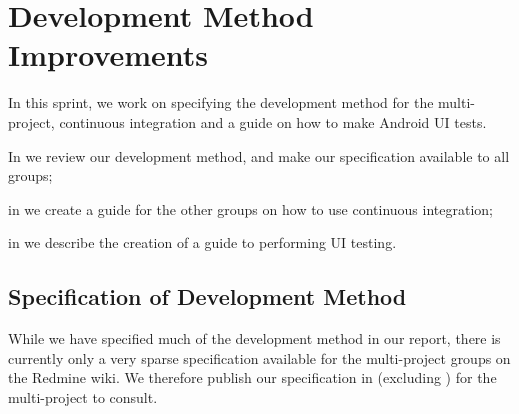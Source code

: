 \chapter{Development Method Improvements}\label{sec:process_improvements}
In this sprint, we work on specifying the development method for the multi-project, continuous integration and a guide on how to make Android UI tests.

\begin{chapterorganization}
  \item In  we review our development method, and make our specification available to all groups;
  \item in  we create a guide for the other groups on how to use continuous integration;
  \item in  we describe the creation of a guide to performing UI testing.
\end{chapterorganization}

\section{Specification of Development Method}\label{sec:processspecs}
While we have specified much of the development method in our report, there is currently only a very sparse specification available for the multi-project groups on the Redmine wiki. We therefore publish our specification in  (excluding ) for the multi-project to consult.

